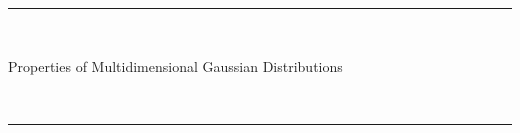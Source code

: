 \documentclass[a4paper]{article}
\theoremstyle{definition}
\begin{document}
\fancyhead[C]{}
\hrule \medskip
\begin{minipage}{0.295\textwidth}
    \raggedright
    \hfill\\
\end{minipage}
\begin{minipage}{0.4\textwidth}
    \centering
    \large
    Properties of Multidimensional Gaussian Distributions\\
\end{minipage}
\begin{minipage}{0.295\textwidth}
    \raggedleft
    \hfill\\
\end{minipage}
\medskip\hrule
\bigskip
 
\end{document}
